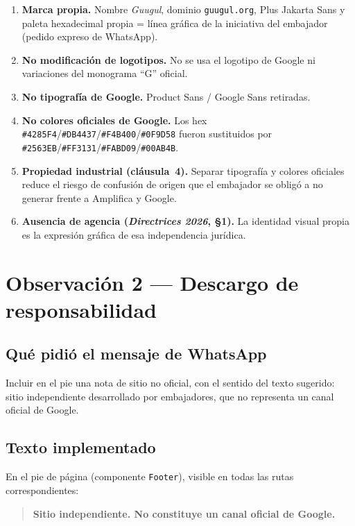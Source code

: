 \documentclass[11pt,a4paper]{article}
\begin{document}
\begin{enumerate}[leftmargin=*]
  \item \textbf{Marca propia.} Nombre \emph{Guugul}, dominio \texttt{guugul.org}, Plus Jakarta Sans y paleta hexadecimal propia = línea gráfica de la iniciativa del embajador (pedido expreso de WhatsApp).
  \item \textbf{No modificación de logotipos.} No se usa el logotipo de Google ni variaciones del monograma \enquote{G} oficial.
  \item \textbf{No tipografía de Google.} Product Sans / Google Sans retiradas.
  \item \textbf{No colores oficiales de Google.} Los hex \texttt{\#4285F4}/\texttt{\#DB4437}/\texttt{\#F4B400}/\texttt{\#0F9D58} fueron sustituidos por \texttt{\#2563EB}/\texttt{\#FF3131}/\texttt{\#FABD09}/\texttt{\#00AB4B}.
  \item \textbf{Propiedad industrial (cláusula~4).} Separar tipografía y colores oficiales reduce el riesgo de confusión de origen que el embajador se obligó a no generar frente a Amplifica y Google.
  \item \textbf{Ausencia de agencia (\emph{Directrices 2026}, §1).} La identidad visual propia es la expresión gráfica de esa independencia jurídica.
\end{enumerate}

\section{Observación 2 --- Descargo de responsabilidad}

\subsection{Qué pidió el mensaje de WhatsApp}

Incluir en el pie una nota de sitio no oficial, con el sentido del texto sugerido: sitio independiente desarrollado por embajadores, que no representa un canal oficial de Google.

\subsection{Texto implementado}

En el pie de página (componente \texttt{Footer}), visible en todas las rutas correspondientes:

\begin{quote}
\centering
\textbf{Sitio independiente. No constituye un canal oficial de Google.}
\end{quote}
\end{document}
